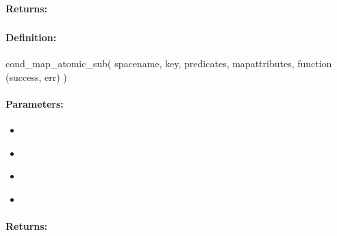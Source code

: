 \paragraph{Returns:}


\pagebreak
\subsubsection{}
\label{api:nodejs:cond_map_atomic_sub}


\paragraph{Definition:}
\begin{javascriptcode}
cond_map_atomic_sub(
        spacename, key, predicates, mapattributes, function (success, err) {})
\end{javascriptcode}
\paragraph{Parameters:}
\begin{itemize}[noitemsep]
\item {}\\

\item {}\\

\item {}\\

\item {}\\

\end{itemize}

\paragraph{Returns:}


\pagebreak
\subsubsection{}
\label{api:nodejs:group_map_atomic_sub}


